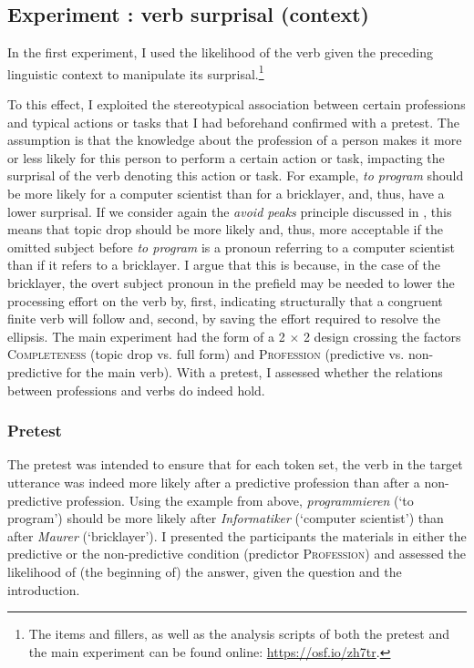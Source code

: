 \subsection{Experiment : verb surprisal (context)}
\label{sec:exp.surprisal}
In the first experiment, I used the likelihood of the verb given the preceding linguistic context to manipulate its surprisal.\footnote{The items and fillers, as well as the analysis scripts of both the pretest and the main experiment can be found online: \url{https://osf.io/zh7tr}.}

To this effect, I exploited the stereotypical association between certain professions and typical actions or tasks that I had beforehand confirmed with a pretest.
The assumption is that the knowledge about the profession of a person makes it more or less likely for this person to perform a certain action or task, impacting the surprisal of the verb denoting this action or task.
For example, \textit{to program} should be more likely for a computer scientist than for a bricklayer, and, thus, have a lower surprisal.
If we consider again the \textit{avoid peaks} principle discussed in , this means that topic drop should be more likely and, thus, more acceptable if the omitted subject before \textit{to program} is a pronoun referring to a computer scientist than if it refers to a bricklayer.
I argue that this is because, in the case of the bricklayer, the overt subject pronoun in the prefield may be needed to lower the processing effort on the verb by, first, indicating structurally that a congruent finite verb will follow and, second, by saving the effort  required to resolve the ellipsis.
The main experiment had the form of a 2 $\times$ 2 design crossing the factors \textsc{Completeness} (topic drop vs. full form) and \textsc{Profession} (predictive vs. non-predictive for the main verb).
With a pretest, I assessed whether the relations between professions and verbs do indeed hold.

\subsubsection{Pretest}\label{sec:exp.surprisal.pretest}
The pretest was intended to ensure that for each token set, the verb in the target utterance was indeed more likely after a predictive profession than after a non-predictive profession.
Using the example from above, \textit{programmieren} (`to program') should be more likely after \textit{Informatiker} (`computer scientist') than after \textit{Maurer} (`bricklayer').
I presented the participants the materials in either the predictive or the non-predictive condition (predictor \textsc{Profession}) and assessed the likelihood of (the beginning of) the answer, given the question and the introduction.

